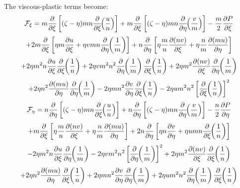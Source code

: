 The viscous-plastic terms become:
\[
   {\cal F}_{\xi} = m {\partial \over \partial \xi} \left[
   (\zeta - \eta ) mn {\partial \over \partial \xi} \!\! \left(
   {u \over n} \right) \right] +
   m {\partial \over \partial \xi} \left[
   (\zeta - \eta ) mn {\partial \over \partial \eta} \!\! \left(
   {v \over m} \right) \right] - {m \over 2}
   {\partial P \over \partial \xi}
\]
\[
   + 2 m {\partial \over \partial \xi} \left[ \eta m
   {\partial u \over \partial \xi} + \eta v mn 
   {\partial \over \partial \eta} \!\! \left( {1 \over m} \right)
   \right]
   + n {\partial \over \partial \eta} \left[ \eta {m \over n}
   {\partial (nv) \over \partial \xi} + \eta {n \over m}
   {\partial (mu) \over \partial \eta} \right]
\]
\[
   + 2 \eta m^2 n {\partial u \over \partial \xi}
   {\partial \over \partial \xi} \!\! \left( {1 \over n} \right)
   + 2 \eta v m^2 n^2
   {\partial \over \partial \eta} \!\! \left( {1 \over m} \right)
   {\partial \over \partial \xi} \!\! \left( {1 \over n} \right)
   + 2 \eta m^2 {\partial (nv) \over \partial \xi}
   {\partial \over \partial \eta} \!\! \left( {1 \over m} \right)
\]
\begin{equation}
   + 2 \eta n^2 {\partial (mu) \over \partial \eta}
   {\partial \over \partial \eta} \!\! \left( {1 \over m} \right)
   - 2 \eta m n^2 {\partial v \over \partial \eta}
   {\partial \over \partial \xi} \!\! \left( {1 \over n} \right)
   - 2 \eta u m^2 n^2 \left[
   {\partial \over \partial \xi} \!\! \left( {1 \over n} \right)
   \right]^2
\end{equation}
\vspace{2 mm}
\[
   {\cal F}_{\eta} = n {\partial \over \partial \eta} \left[
   (\zeta - \eta ) mn {\partial \over \partial \xi} \!\! \left(
   {u \over n} \right) \right] +
   n {\partial \over \partial \eta} \left[
   (\zeta - \eta ) mn {\partial \over \partial \eta} \!\! \left(
   {v \over m} \right) \right] - {n \over 2}
   {\partial P \over \partial \eta}
\]
\[
   + m {\partial \over \partial \xi} \left[ \eta {m \over n}
   {\partial (nv) \over \partial \xi} + \eta {n \over m}
   {\partial (mu) \over \partial \eta} \right]
   + 2n {\partial \over \partial \eta} \left[ \eta n
   {\partial v \over \partial \eta} + \eta u mn 
   {\partial \over \partial \xi} \!\! \left( {1 \over n} \right)
   \right]
\]
\[
   - 2 \eta m^2 n {\partial u \over \partial \xi}
   {\partial \over \partial \eta} \!\! \left( {1 \over m} \right)
   - 2 \eta v m^2 n^2 \left[
   {\partial \over \partial \eta} \!\! \left( {1 \over m} \right)
   \right]^2
   + 2 \eta m^2 {\partial (nv) \over \partial \xi}
   {\partial \over \partial \xi} \!\! \left( {1 \over n} \right)
\]
\begin{equation}
   + 2 \eta n^2 {\partial (mu) \over \partial \eta}
   {\partial \over \partial \xi} \!\! \left( {1 \over n} \right)
   + 2 \eta m n^2 {\partial v \over \partial \eta}
   {\partial \over \partial \eta} \!\! \left( {1 \over m} \right)
   + 2 \eta u m^2 n^2
   {\partial \over \partial \eta} \!\! \left( {1 \over m} \right)
   {\partial \over \partial \xi} \!\! \left( {1 \over n} \right)
\end{equation}


